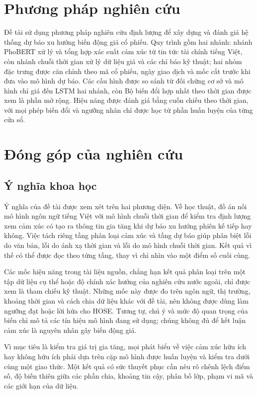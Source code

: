 \section{Phương pháp nghiên cứu}

Đề tài sử dụng phương pháp nghiên cứu định lượng để xây dựng và đánh giá hệ thống dự báo
xu hướng biến động giá cổ phiếu. Quy trình gồm hai nhánh: nhánh PhoBERT xử lý và tổng hợp
xác suất cảm xúc từ tin tức tài chính tiếng Việt, còn nhánh chuỗi thời gian xử lý dữ liệu
giá và các chỉ báo kỹ thuật; hai nhóm đặc trưng được căn chỉnh theo mã cổ phiếu, ngày giao
dịch và mốc cắt trước khi đưa vào mô hình dự báo. Các cấu hình được so sánh từ đối chứng cơ sở và
mô hình chỉ giá đến LSTM hai nhánh, còn Bộ biến đổi hợp nhất theo thời gian được xem là phần mở
rộng. Hiệu năng được đánh giá bằng cuốn chiếu theo thời gian, với mọi phép
biến đổi và ngưỡng nhãn chỉ được học từ phần huấn luyện của từng cửa sổ.

\section{Đóng góp của nghiên cứu}

\subsection{Ý nghĩa khoa học}

Ý nghĩa của đề tài được xem xét trên hai phương diện. Về học thuật, đồ án nối mô hình
ngôn ngữ tiếng Việt với mô hình chuỗi thời gian để kiểm tra định lượng xem cảm xúc có
tạo ra thông tin gia tăng khi dự báo xu hướng phiên kế tiếp hay không. Việc tách riêng
tầng phân loại cảm xúc và tầng dự báo giúp phân biệt lỗi do văn bản, lỗi do ánh xạ thời
gian và lỗi do mô hình chuỗi thời gian. Kết quả vì thế có thể được đọc theo từng tầng,
thay vì chỉ nhìn vào một điểm số cuối cùng.

Các mốc hiệu năng trong tài liệu nguồn, chẳng hạn kết quả phân loại trên một tập dữ
liệu cụ thể hoặc độ chính xác hướng của nghiên cứu nước ngoài, chỉ được xem là tham
chiếu kỹ thuật. Những mốc này được đo trên ngôn ngữ, thị trường, khoảng thời gian và
cách chia dữ liệu khác với đề tài, nên không được dùng làm ngưỡng đạt hoặc lời hứa cho
HOSE. Tương tự, chú ý và mức độ quan trọng của biến chỉ mô tả các tín hiệu mô hình đang
sử dụng; chúng không đủ để kết luận cảm xúc là nguyên nhân gây biến động giá.

Vì mục tiêu là kiểm tra giá trị gia tăng, mọi phát biểu về việc cảm xúc hữu ích hay
không hữu ích phải dựa trên cặp mô hình được huấn luyện và kiểm tra dưới cùng một
giao thức. Một kết quả có sức thuyết phục cần nêu rõ chênh lệch điểm số, độ biến thiên
giữa các phần chia, khoảng tin cậy, phân bố lớp, phạm vi mã và các giới hạn của dữ liệu.

